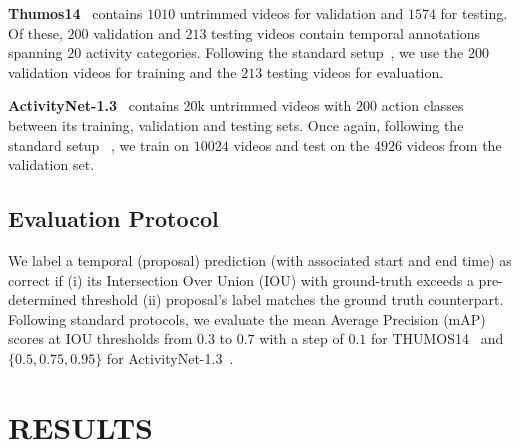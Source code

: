 \documentclass[10pt,twocolumn,letterpaper]{article}
\begin{document}
\textbf{Thumos14}~\cite{THUMOS14} contains $1010$ untrimmed videos for validation and $1574$ for testing. Of these, $200$ validation and $213$ testing videos contain temporal annotations spanning $20$ activity categories. Following the standard setup~\cite{Xu_2020_CVPR,PGCN2019ICCV}, we use the $200$ validation videos for training and the $213$ testing videos for evaluation. 

\textbf{ActivityNet-1.3}~\cite{Heilbron_2015_CVPR} contains 20k untrimmed videos with $200$ action classes between its training, validation and testing sets. Once again, following the standard setup~\cite{Xu_2020_CVPR,PGCN2019ICCV} , we train on $10024$ videos and test on the $4926$ videos from the validation set. 

\subsection{Evaluation Protocol}
\label{sec:evalprotocol}

We label a temporal (proposal) prediction (with associated start and end time) as correct if (i) its Intersection Over Union (IOU) with ground-truth exceeds a pre-determined threshold (ii) proposal's label matches the ground truth counterpart. Following standard protocols, we evaluate the mean Average Precision (mAP) scores at IOU thresholds from $0.3$ to $0.7$ with a step of $0.1$ for THUMOS14~\cite{THUMOS14} and $\{0.5,0.75,0.95\}$ for ActivityNet-1.3~\cite{Heilbron_2015_CVPR}.


\section{\uppercase{ Results}}
\label{sec:results}
\end{document}
